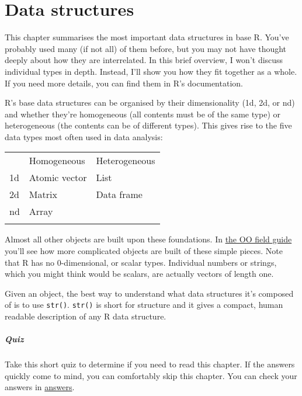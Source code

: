 \chapter{Data structures}\label{data-structures}

This chapter summarises the most important data structures in base R.
You've probably used many (if not all) of them before, but you may not
have thought deeply about how they are interrelated. In this brief
overview, I won't discuss individual types in depth. Instead, I'll show
you how they fit together as a whole. If you need more details, you can
find them in R's documentation.

R's base data structures can be organised by their dimensionality (1d,
2d, or nd) and whether they're homogeneous (all contents must be of the
same type) or heterogeneous (the contents can be of different types).
This gives rise to the five data types most often used in data analysis:

\begin{longtable}[c]{@{}lll@{}}
\toprule\addlinespace
& Homogeneous & Heterogeneous
\\\addlinespace
\midrule\endhead
1d & Atomic vector & List
\\\addlinespace
2d & Matrix & Data frame
\\\addlinespace
nd & Array &
\\\addlinespace
\bottomrule
\end{longtable}

Almost all other objects are built upon these foundations. In
\hyperref[oo]{the OO field guide} you'll see how more complicated
objects are built of these simple pieces. Note that R has no
0-dimensional, or scalar types. Individual numbers or strings, which you
might think would be scalars, are actually vectors of length one.

Given an object, the best way to understand what data structures it's
composed of is to use \texttt{str()}. \texttt{str()} is short for
structure and it gives a compact, human readable description of any R
data structure. 

\paragraph{Quiz}

Take this short quiz to determine if you need to read this chapter. If
the answers quickly come to mind, you can comfortably skip this chapter.
You can check your answers in
\hyperref[data-structure-answers]{answers}.

